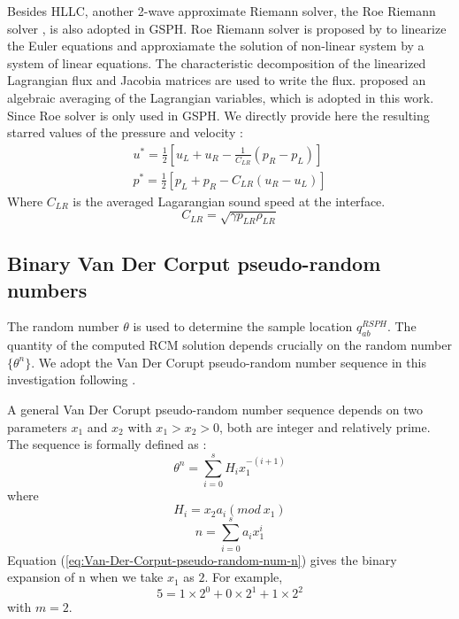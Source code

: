 Besides HLLC, another 2-wave approximate Riemann solver, the Roe Riemann solver \citep{roe1981approximate}, is also adopted in GSPH.
Roe Riemann solver is proposed by \citet{roe1981approximate} to linearize the Euler equations and approxiamate the solution of non-linear system by a system of linear equations. The characteristic decomposition of the linearized Lagrangian flux and Jacobia matrices are used to write the flux. \citet{rider1994review} proposed an algebraic averaging of the Lagrangian variables, which is adopted in this work. Since Roe solver is only used in GSPH. We directly provide here the resulting starred values of the pressure and velocity \citep{puri2014approximate}: 
\begin{eqnarray}
u^{\ast} = \frac{1}{2} \left[ u_L + u_R - \frac{1}{C_{LR}} (p_R - p_L) \right] \label{eq:RP-solver-ROE-u} \\
p^{\ast} = \frac{1}{2}\left[ p_L + p_R - C_{LR} (u_R - u_L) \right] \label{eq:RP-solver-ROE-p}
\end{eqnarray}
Where $C_{LR}$ is the averaged Lagarangian sound speed at the interface.
\begin{equation}
C_{LR} = \sqrt{\gamma p_{LR} \rho_{LR}}
\end{equation}

\subsection{Binary Van Der Corput pseudo-random numbers} \label{sec:Van-Der-Corput-random-num}
The random number $\theta$ is used to determine the sample location $q_{ab}^{RSPH}$. The quantity of the computed RCM solution depends crucially on the random number $\{\theta ^n\}$. We adopt the Van Der Corupt pseudo-random number sequence \citep{hammersley2013monte} in this investigation following \citet{colella1982glimm}.

A general Van Der Corupt pseudo-random number sequence depends on two parameters $x_1$ and $x_2$ with $x_1 > x_2 > 0$, both are integer and relatively prime. The sequence is formally defined as \citep{hammersley2013monte}:
\begin{equation}
\theta ^n = \sum_{i=0}^{s} H_i x_1^{-(i+1)}
\label{eq:Van-Der-Corput-pseudo-random-num}
\end{equation}
where
\begin{equation}
H_i = x_2 a_i(mod \ x_1)
\label{eq:Van-Der-Corput-pseudo-random-num-Hi}
\end{equation} 
\begin{equation}
n = \sum_{i=0}^{s} a_i x_1^i
\label{eq:Van-Der-Corput-pseudo-random-num-n}
\end{equation} 
Equation (\ref{eq:Van-Der-Corput-pseudo-random-num-n}) gives the binary expansion of n when we take $x_1$ as $2$. For example,
\begin{equation}
5=1 \times 2^0 + 0 \times 2^1 + 1 \times 2^2
\end{equation}
with $m=2$. 

